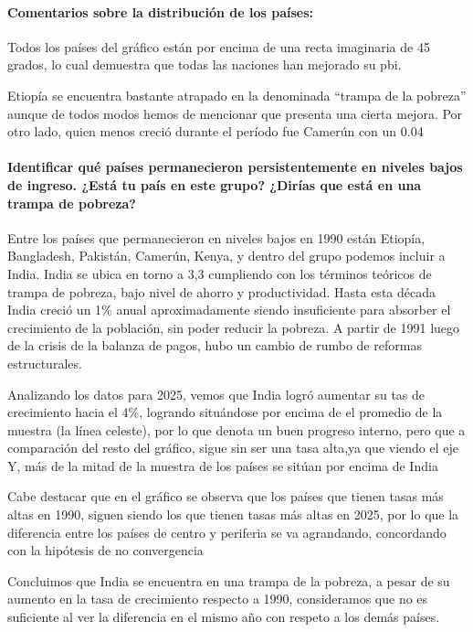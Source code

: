 \documentclass[11pt, a4paper]{article}
\begin{document}
\paragraph{Comentarios sobre la distribución de los países:}

Todos los países del gráfico están por encima de una recta imaginaria de 45 grados, lo cual demuestra que todas las naciones han mejorado su pbi.

Etiopía se encuentra bastante atrapado en la denominada ``trampa de la pobreza'' aunque de todos modos hemos de mencionar que presenta una cierta mejora. Por otro lado, quien menos creció durante el período fue Camerún con un 0.04

\paragraph{Identificar qué países permanecieron persistentemente en niveles bajos de ingreso. ¿Está tu país en este grupo? ¿Dirías que está en una trampa de pobreza?}

Entre los países que permanecieron en niveles bajos en 1990 están Etiopía, Bangladesh, Pakistán, Camerún, Kenya, y dentro del grupo podemos incluir a India. India se ubica en torno a 3,3 cumpliendo con los términos teóricos de trampa de pobreza, bajo nivel de ahorro y productividad. Hasta esta década India creció un 1\% anual aproximadamente siendo insuficiente para absorber el crecimiento de la población, sin poder reducir la pobreza. A partir de 1991 luego de la crisis de la balanza de pagos, hubo un cambio de rumbo de reformas estructurales.

Analizando los datos para 2025, vemos que India logró aumentar su tas de crecimiento hacia el 4\%, logrando situándose por encima de el promedio de la muestra (la línea celeste), por lo que denota un buen progreso interno, pero que a comparación del resto del gráfico, sigue sin ser una tasa alta,ya que viendo el eje Y, más de la mitad de la muestra de los países se sitúan por encima de India

Cabe destacar que en el gráfico se observa que los países que tienen tasas más altas en 1990, siguen siendo los que tienen tasas más altas en 2025, por lo que la diferencia entre los países de centro y periferia se va agrandando, concordando con la hipótesis de no convergencia

Concluimos que India se encuentra en una trampa de la pobreza, a pesar de su aumento en la tasa de crecimiento respecto a 1990, consideramos que no es suficiente al ver la diferencia en el mismo año con respeto a los demás países.
\end{document}
